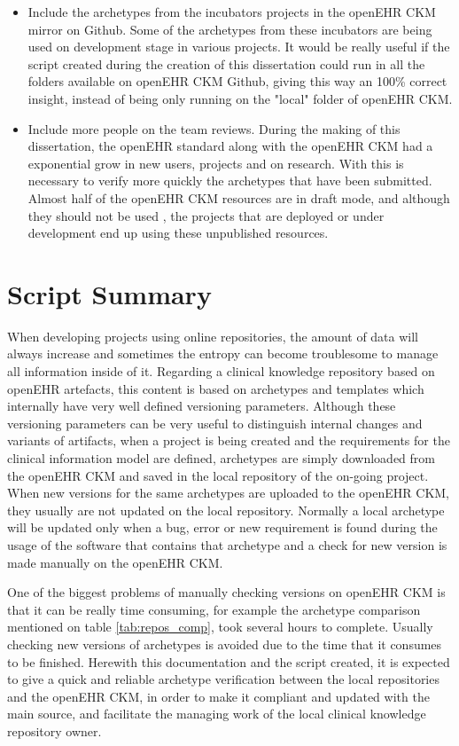 \documentclass[mim_thesis.tex]{subfiles}
\begin{document}
\begin{itemize}
\item Include the archetypes from the incubators projects in the openEHR CKM mirror on Github. Some of the archetypes from these incubators are being used on development stage in various projects. It would be really useful if the  script created during the creation of this dissertation could run in all the folders available on openEHR CKM Github, giving this way an 100\% correct insight, instead of being only running on the "local" folder of openEHR CKM.  

\item Include more people on the team reviews. During the making of this dissertation, the openEHR standard along with the openEHR CKM had a exponential grow in new users, projects and on research. With this is necessary to verify more quickly the archetypes that have been submitted. Almost half of the openEHR CKM resources are in draft mode, and although they should not be used \citep{ljosland2015national}, the projects that are deployed or under development end up using these unpublished resources.  

\end{itemize}   


\section{Script Summary}
When developing projects using online repositories, the amount of data will always increase and sometimes the entropy can become troublesome to manage all information inside of it. Regarding a clinical knowledge repository based on openEHR artefacts, this content is based on archetypes and templates which internally have very well defined versioning parameters. Although these versioning parameters can be very useful to distinguish internal changes and variants of artifacts, when a project is being created and the requirements for the clinical information model are defined, archetypes are simply downloaded from the openEHR CKM and saved in the local repository of the on-going project. When new versions for the same archetypes are uploaded to the openEHR CKM, they usually are not updated on the local repository. Normally a local archetype will be updated only when a bug, error or new requirement is found during the usage of the software that contains that archetype and a check for new version is made manually on the openEHR CKM. 

One of the biggest problems of manually checking versions on openEHR CKM is that it can be really time consuming, for example the archetype comparison mentioned on table \ref{tab:repos_comp}, took several hours to complete. Usually checking new versions of archetypes is avoided due to the time that it consumes to be finished. Herewith this documentation and the script created, it is expected to give a quick and reliable archetype verification between the local repositories and the openEHR CKM, in order to make it compliant and updated with the main source, and facilitate the managing work of the local clinical knowledge repository owner. 
\end{document}
